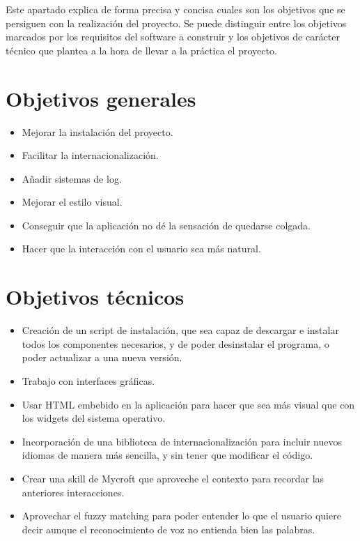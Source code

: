
Este apartado explica de forma precisa y concisa cuales son los objetivos que se persiguen con la realización del proyecto. Se puede distinguir entre los objetivos marcados por los requisitos del software a construir y los objetivos de carácter técnico que plantea a la hora de llevar a la práctica el proyecto.

\section*{Objetivos generales}
\begin{itemize}
    \item Mejorar la instalación del proyecto.
    \item Facilitar la internacionalización.
    \item Añadir sistemas de log.
    \item Mejorar el estilo visual.
    \item Conseguir que la aplicación no dé la sensación de quedarse colgada.
    \item Hacer que la interacción con el usuario sea más natural.
\end{itemize}

\section*{Objetivos técnicos}
\begin{itemize}
    \item Creación de un script de instalación, que sea capaz de descargar e instalar todos los componentes necesarios, y de poder desinstalar el programa, o poder actualizar a una nueva versión.
    \item Trabajo con interfaces gráficas.
    \item Usar HTML embebido en la aplicación para hacer que sea más visual que con los widgets del sistema operativo.
    \item Incorporación de una biblioteca de internacionalización para incluir nuevos idiomas de manera más sencilla, y sin tener que modificar el código.
    \item Crear una skill de Mycroft que aproveche el contexto para recordar las anteriores interacciones.
    \item Aprovechar el fuzzy matching para poder entender lo que el usuario quiere decir aunque el reconocimiento de voz no entienda bien las palabras.
\end{itemize}
